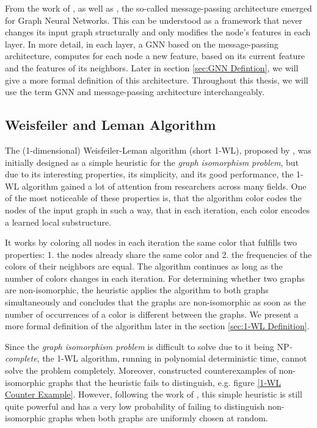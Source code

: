 \documentclass[11pt, dvipsnames, DIV=12]{scrreprt}
\theoremstyle{definition}
\begin{document}
From the work of \cite{Gil+2017}, as well as \cite{Sca+2009}, the so-called message-passing architecture emerged for Graph Neural Networks. This can be understood as a framework that never changes its input graph structurally and only modifies the node's features in each layer. In more detail, in each layer, a GNN based on the message-passing architecture, computes for each node a new feature, based on its current feature and the features of its neighbors. Later in section \ref{sec:GNN Defintion}, we will give a more formal definition of this architecture.
Throughout this thesis, we will use the term GNN and message-passing architecture interchangeably.


\subsection{Weisfeiler and Leman Algorithm}
The (1-dimensional) Weisfeiler-Leman algorithm (short 1-WL), proposed by \cite{Wei+1968}, was initially designed as a simple heuristic for the \textit{graph isomorphism problem}, but due to its interesting properties, its simplicity, and its good performance, the 1-WL algorithm gained a lot of attention from researchers across many fields. One of the most noticeable of these properties is, that the algorithm color codes the nodes of the input graph in such a way, that in each iteration, each color encodes a learned local substructure.

It works by coloring all nodes in each iteration the same color that fulfills two properties: 1. the nodes already share the same color and 2. the frequencies of the colors of their neighbors are equal. The algorithm continues as long as the number of colors changes in each iteration.
For determining whether two graphs are non-isomorphic, the heuristic applies the algorithm to both graphs simultaneously and concludes that the graphs are non-isomorphic as soon as the number of occurrences of a color is different between the graphs. We present a more formal definition of the algorithm later in the section \ref{sec:1-WL Definition}.

Since the \textit{graph isomorphism problem} is difficult to solve due to it being \textsf{NP}\textit{-complete}, the 1-WL algorithm, running in polynomial deterministic time, cannot solve the problem completely. Moreover, \cite{Cai1992} constructed counterexamples of non-isomorphic graphs that the heuristic fails to distinguish, e.g. figure \ref{1-WL Counter Example}. However, following the work of \cite{Bab+1979}, this simple heuristic is still quite powerful and has a very low probability of failing to distinguish non-isomorphic graphs when both graphs are uniformly chosen at random.
\end{document}
